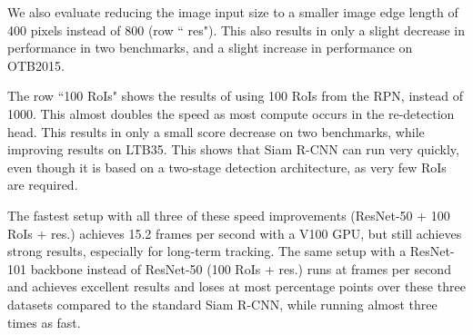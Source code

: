 \documentclass[10pt,twocolumn,letterpaper]{article}
\begin{document}
We also evaluate reducing the image input size to a smaller image edge length of 400 pixels instead of 800 (row `` res"). This also results in only a slight decrease in performance in two benchmarks, and a slight increase in performance on OTB2015.

The row ``100 RoIs" shows the results of using 100 RoIs from the RPN, instead of 1000. This almost doubles the speed as most compute occurs in the re-detection head. This results in only a small score decrease on two  benchmarks, while improving results on LTB35. This shows that Siam R-CNN can run very quickly, even though it is based on a two-stage detection architecture, as very few RoIs are required.

The fastest setup with all three of these speed improvements (ResNet-50 + 100 RoIs +  res.) achieves 15.2 frames per second with a V100 GPU, but still achieves strong results, especially for long-term tracking. The same setup with a ResNet-101 backbone instead of ResNet-50 (100 RoIs +  res.) runs at  frames per second and achieves excellent results and loses at most  percentage points over these three datasets compared to the standard Siam R-CNN, while running almost three times as fast.
\end{document}
